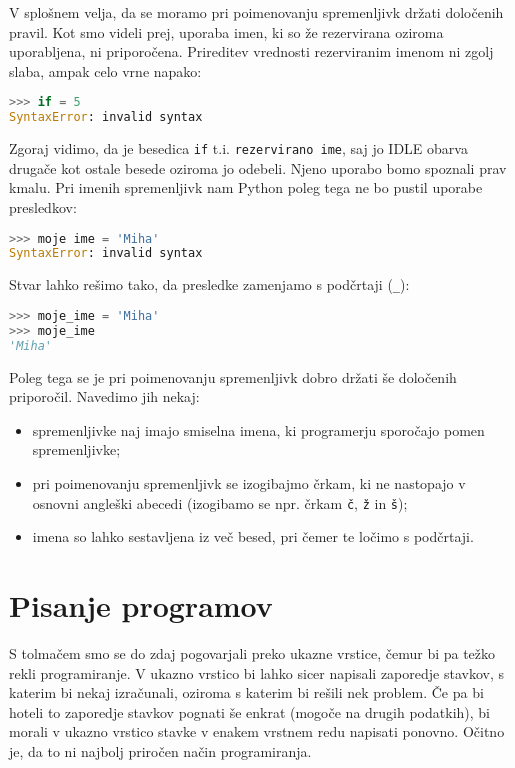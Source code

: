 V splošnem velja, da se moramo pri poimenovanju spremenljivk držati določenih pravil. Kot smo videli prej, uporaba imen, ki so že rezervirana oziroma uporabljena, ni priporočena. Prireditev vrednosti rezerviranim imenom ni zgolj slaba, ampak celo vrne napako:
\begin{lstlisting}[language=Python, showstringspaces=false]
>>> if = 5
SyntaxError: invalid syntax
\end{lstlisting}
Zgoraj vidimo, da je besedica \texttt{if} t.i. \texttt{rezervirano ime}, saj jo IDLE obarva drugače kot ostale besede oziroma jo odebeli. Njeno uporabo bomo spoznali prav kmalu. Pri imenih spremenljivk nam Python poleg tega ne bo pustil uporabe presledkov:
\begin{lstlisting}[language=Python, showstringspaces=false]
>>> moje ime = 'Miha'
SyntaxError: invalid syntax
\end{lstlisting}
Stvar lahko rešimo tako, da presledke zamenjamo s podčrtaji (\texttt{\_}):
\begin{lstlisting}[language=Python, showstringspaces=false]
>>> moje_ime = 'Miha'
>>> moje_ime
'Miha'
\end{lstlisting}
Poleg tega se je pri poimenovanju spremenljivk dobro držati še določenih priporočil. Navedimo jih nekaj:
\begin{itemize}
    \item spremenljivke naj imajo smiselna imena, ki programerju sporočajo pomen spremenljivke;
    \item pri poimenovanju spremenljivk se izogibajmo črkam, ki ne nastopajo v osnovni angleški abecedi (izogibamo se npr. črkam \texttt{č}, \texttt{ž} in \texttt{š});
    \item imena so lahko sestavljena iz več besed, pri čemer te ločimo s podčrtaji.
\end{itemize}

\section{Pisanje programov}

S tolmačem smo se do zdaj pogovarjali preko ukazne vrstice, čemur bi pa težko rekli programiranje. V ukazno vrstico bi lahko sicer napisali zaporedje stavkov, s katerim bi nekaj izračunali, oziroma s katerim bi rešili nek problem. Če pa bi hoteli to zaporedje stavkov pognati še enkrat (mogoče na drugih podatkih), bi morali v ukazno vrstico stavke v enakem vrstnem redu napisati ponovno. Očitno je, da to ni najbolj priročen način programiranja.

